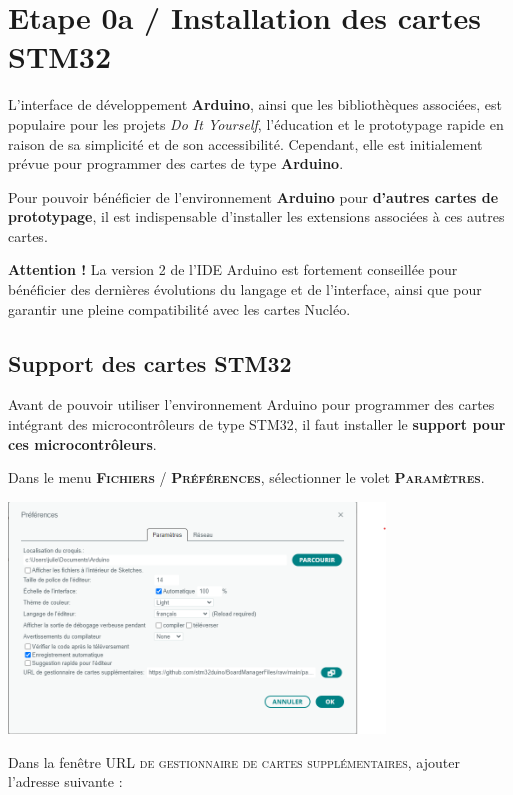\documentclass[a4paper,11pt,titlepage]{article} %
\begin{document}
\section{Etape 0a / Installation des cartes STM32}

L'interface de développement \textbf{Arduino}, ainsi que les bibliothèques associées, est populaire pour les projets \textit{Do It Yourself}, l'éducation et le prototypage rapide en raison de sa simplicité et de son accessibilité. Cependant, elle est initialement prévue pour programmer des cartes de type \textbf{Arduino}.

Pour pouvoir bénéficier de l'environnement \textbf{Arduino} pour \textbf{d'autres cartes de prototypage}, il est indispensable d'installer les extensions associées à ces autres cartes.

\textbf{Attention !} La version 2 de l'IDE Arduino est fortement conseillée pour bénéficier des dernières évolutions du langage et de l'interface, ainsi que pour garantir une pleine compatibilité avec les cartes Nucléo.

\subsection{Support des cartes STM32}

Avant de pouvoir utiliser l'environnement Arduino pour programmer des cartes intégrant des microcontrôleurs de type STM32, il faut installer le \textbf{support pour ces microcontrôleurs}.

Dans le menu \textsc{\textbf{Fichiers} / \textbf{Préférences}}, sélectionner le volet \textsc{\textbf{Paramètres}}.

\begin{center}
	\includegraphics[width=0.75\textwidth]{images/arduino_preferences.png}
\end{center}

Dans la fenêtre \textsc{URL de gestionnaire de cartes supplémentaires}, ajouter l'adresse suivante :
\end{document}
